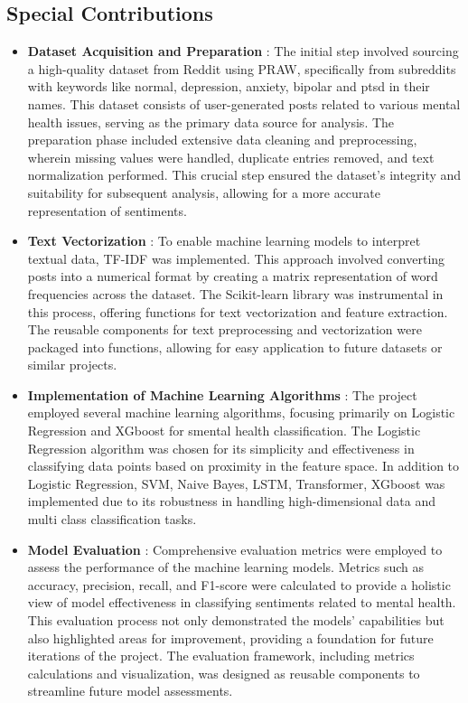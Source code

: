 \subsection{Special Contributions}
\begin{itemize}
    \item \textbf{Dataset Acquisition and Preparation} :
    \noindent
    The initial step involved sourcing a high-quality dataset from Reddit using PRAW, specifically from subreddits with keywords like normal, depression, anxiety, bipolar and ptsd in their names. This dataset consists of user-generated posts related to various mental health issues, serving as the primary data source for analysis. The preparation phase included extensive data cleaning and preprocessing, wherein missing values were handled, duplicate entries removed, and text normalization performed. This crucial step ensured the dataset's integrity and suitability for subsequent analysis, allowing for a more accurate representation of sentiments.
    \item \textbf{Text Vectorization} :
    \noindent
    To enable machine learning models to interpret textual data, TF-IDF was implemented. This approach involved converting posts into a numerical format by creating a matrix representation of word frequencies across the dataset. The Scikit-learn library was instrumental in this process, offering functions for text vectorization and feature extraction. The reusable components for text preprocessing and vectorization were packaged into functions, allowing for easy application to future datasets or similar projects.
    \item \textbf{Implementation of Machine Learning Algorithms} :
    \noindent
    The project employed several machine learning algorithms, focusing primarily on Logistic Regression and XGboost for smental health classification. The Logistic Regression algorithm was chosen for its simplicity and effectiveness in classifying data points based on proximity in the feature space. In addition to Logistic Regression, SVM, Naive Bayes, LSTM, Transformer, XGboost was implemented due to its robustness in handling high-dimensional data and multi class classification tasks. 
    \item \textbf{Model Evaluation} :
    \noindent
    Comprehensive evaluation metrics were employed to assess the performance of the machine learning models. Metrics such as accuracy, precision, recall, and F1-score were calculated to provide a holistic view of model effectiveness in classifying sentiments related to mental health. This evaluation process not only demonstrated the models' capabilities but also highlighted areas for improvement, providing a foundation for future iterations of the project. The evaluation framework, including metrics calculations and visualization, was designed as reusable components to streamline future model assessments.

\end{itemize}
